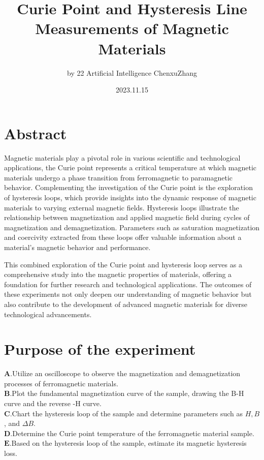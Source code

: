 \documentclass[UTF8]{article}
\title{Curie Point and Hysteresis Line Measurements of Magnetic Materials}
\author{by 22 Artificial Intelligence ChenxuZhang}
\date{2023.11.15}
\begin{document}
	
	\fancyfoot[C]{\thepage}
	
	\maketitle
	\tableofcontents
	\newpage
	
	\section{Abstract}
Magnetic materials play a pivotal role in various scientific and technological applications, the Curie point represents a critical temperature at which magnetic materials undergo a phase transition from ferromagnetic to paramagnetic behavior. Complementing the investigation of the Curie point is the exploration of hysteresis loops, which provide insights into the dynamic response of magnetic materials to varying external magnetic fields. Hysteresis loops illustrate the relationship between magnetization and applied magnetic field during cycles of magnetization and demagnetization. Parameters such as saturation magnetization and coercivity extracted from these loops offer valuable information about a material's magnetic behavior and performance.

 This combined exploration of the Curie point and hysteresis loop serves as a comprehensive study into the magnetic properties of materials, offering a foundation for further research and technological applications. The outcomes of these experiments not only deepen our understanding of magnetic behavior but also contribute to the development of advanced magnetic materials for diverse technological advancements.
 
	
\section{Purpose of the experiment}
   $\bm{A}$.Utilize an oscilloscope to observe the magnetization and demagnetization processes of ferromagnetic materials.\\
   $\bm{B}$.Plot the fundamental magnetization curve of the sample, drawing the B-H curve and the reverse -H curve.\\
   $\bm{C}$.Chart the hysteresis loop of the sample and determine parameters such as $H, B$, and $\Delta B$.\\
   $\bm{D}$.Determine the Curie point temperature of the ferromagnetic material sample.\\
   $\bm{E}$.Based on the hysteresis loop of the sample, estimate its magnetic hysteresis loss.
   
\end{document}
